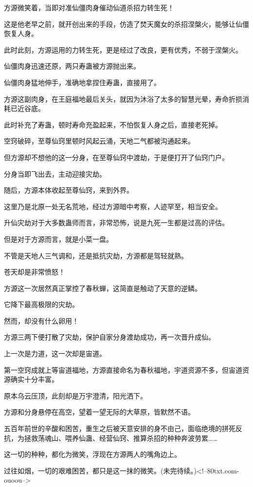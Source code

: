 \begin{this_body}
方源微笑着，当即对准仙僵肉身催动仙道杀招力转生死！

这是他老早之前，就开创出来的手段，仿造了焚天魔女的杀招涅槃火，能够让仙僵恢复人身。

此时此刻，方源运用的力转生死，更是经过了改良，更有优秀，不弱于涅槃火。

仙僵肉身迅速还原，两只寿蛊被方源抛出来。

仙僵肉身猛地伸手，准确地拿捏住寿蛊，直接用了。

方源这副肉身，在王庭福地最后关头，就因为沐浴了太多的智慧光晕，寿命折损消耗已近谷底。

此时补充了寿蛊，顿时寿命充盈起来，不怕恢复人身之后，直接老死掉。

空窍破碎，至尊仙窍里顿时风起云涌，天地二气都被沟通起来。

但方源却不想他的这一分身，在至尊仙窍中渡劫，于是便打开了仙窍门户。

分身当即飞出去，主动迎接灾劫。

随后，方源本体收起至尊仙窍，来到外界。

这里乃是北原一处无名荒地，经过方源暗中考察，人迹罕至，相当安全。

升仙灾劫对于大多数蛊师而言，非常恐怖，说是九死一生都是过高的评估。

但是对于方源而言，就是小菜一盘。

不管是天地人三气调和，还是抵抗灾劫，方源都是驾轻就熟。

苍天却是非常愤怒！

方源这一次居然真正掌控了春秋蝉，这简直是触动了天意的逆鳞。

它降下最高极限的灾劫。

然而，却没有什么卵用！

方源三两下便打散了灾劫，保护自家分身渡劫成功，再一次晋升成仙。

上一次是力道，这一次却是宙道。

第一空窍成就上等宙道福地，方源直接命名为春秋福地，宇道资源不多，但宙道资源确实十分丰富。

原本乌云压顶，此刻却是万宇澄清，阳光洒下。

方源和分身悬停在高空，望着一望无际的大草原，皆默然不语。

五百年前世的辛酸和困苦，重生之后被天意安排的身不由己，面临绝境的拼死反抗，为拯救荡魂山、喂养仙蛊、经营仙窍、推算杀招的种种奔波劳累……

这一切的种种，都化为微笑，浮现在方源两人的嘴角边上。

过往如烟，一切的艰难困苦，都只是这一抹的微笑。(未完待续。)<!--80txt.com-ouoou-->

\end{this_body}

